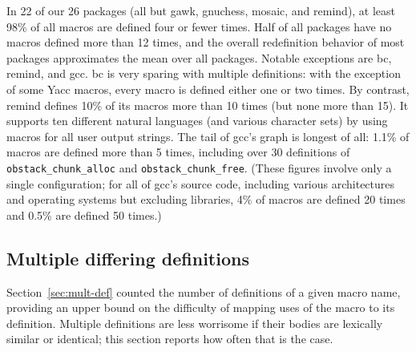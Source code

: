 \documentclass[10pt]{article}
\newcommand{\pkg}[1]{\textsf{#1}}
\begin{document}

In 22 of our 26 packages (all but \pkg{gawk}, \pkg{gnuchess},
\pkg{mosaic}, and \pkg{remind}), at least 98\% of all macros are defined
four or fewer times.  Half of all packages have no macros defined more than
12 times, and the overall redefinition behavior of most packages
approximates the mean over all packages.  Notable
exceptions are \pkg{bc}, \pkg{remind}, and \pkg{gcc}.  \pkg{bc} is very
sparing with multiple definitions: with the exception of some Yacc macros,
every macro is defined either one or two times.  By contrast, \pkg{remind}
defines 10\% of its macros more than 10 times (but none more than 15).  It
supports ten different natural languages (and various character sets) by
using macros for all user output strings.  The tail of \pkg{gcc}'s graph is
longest of all: 1.1\% of macros are defined more than 5 times, including
over 30 definitions of \verb|obstack_chunk_alloc| and
\verb|obstack_chunk_free|.  (These figures involve only a single
configuration; for all of \pkg{gcc}'s source code, including various
architectures and operating systems but excluding libraries, 4\% of macros
are defined 20 times and 0.5\% are defined 50 times.)

        
\subsection{Multiple differing definitions}
\label{sec:mult-diff-def}

Section~\ref{sec:mult-def} counted the number of definitions of a given
macro name, providing an upper bound on the difficulty of
mapping uses of the macro to its definition.  
Multiple definitions are less worrisome if
their bodies are lexically similar or identical; this section reports how
often that is the case.
\end{document}
